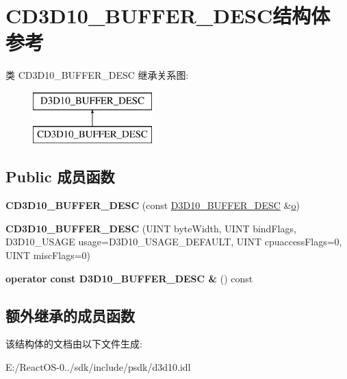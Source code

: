 \hypertarget{struct_c_d3_d10___b_u_f_f_e_r___d_e_s_c}{}\section{C\+D3\+D10\+\_\+\+B\+U\+F\+F\+E\+R\+\_\+\+D\+E\+S\+C结构体 参考}
\label{struct_c_d3_d10___b_u_f_f_e_r___d_e_s_c}
类 C\+D3\+D10\+\_\+\+B\+U\+F\+F\+E\+R\+\_\+\+D\+E\+SC 继承关系图\+:\begin{figure}[H]
\begin{center}
\leavevmode
\includegraphics[height=2.000000cm]{struct_c_d3_d10___b_u_f_f_e_r___d_e_s_c}
\end{center}
\end{figure}
\subsection*{Public 成员函数}
\begin{DoxyCompactItemize}
\item 
\mbox{\label{struct_c_d3_d10___b_u_f_f_e_r___d_e_s_c_a975d831e7e03d7563ce91695d2ea968f}} 
{\bfseries C\+D3\+D10\+\_\+\+B\+U\+F\+F\+E\+R\+\_\+\+D\+E\+SC} (const \hyperlink{struct_d3_d10___b_u_f_f_e_r___d_e_s_c}{D3\+D10\+\_\+\+B\+U\+F\+F\+E\+R\+\_\+\+D\+E\+SC} \&\hyperlink{opengl_2mesa_2main_2extensions_8c_ac02068cf344ef10efe2778c164d1233e}{o})
\item 
\mbox{\label{struct_c_d3_d10___b_u_f_f_e_r___d_e_s_c_ac12e9a761ce74e5ec95635d858e3bbbf}} 
{\bfseries C\+D3\+D10\+\_\+\+B\+U\+F\+F\+E\+R\+\_\+\+D\+E\+SC} (U\+I\+NT byte\+Width, U\+I\+NT bind\+Flags, D3\+D10\+\_\+\+U\+S\+A\+GE usage=D3\+D10\+\_\+\+U\+S\+A\+G\+E\+\_\+\+D\+E\+F\+A\+U\+LT, U\+I\+NT cpuaccess\+Flags=0, U\+I\+NT misc\+Flags=0)
\item 
\mbox{\label{struct_c_d3_d10___b_u_f_f_e_r___d_e_s_c_abd3d402a04496892729f50f885f4c986}} 
{\bfseries operator const D3\+D10\+\_\+\+B\+U\+F\+F\+E\+R\+\_\+\+D\+E\+S\+C \&} () const
\end{DoxyCompactItemize}
\subsection*{额外继承的成员函数}


该结构体的文档由以下文件生成\+:\begin{DoxyCompactItemize}
\item 
E\+:/\+React\+O\+S-\/0../sdk/include/psdk/d3d10.\+idl\end{DoxyCompactItemize}
